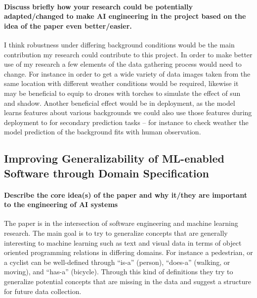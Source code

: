 \documentclass[pra, onecolumn,superscriptaddress,nofootinbib]{revtex4}
\begin{document}
\paragraph{Discuss briefly how your research could be potentially adapted/changed to make AI engineering in the project based on the idea of the paper even better/easier.\\}

    I think robustness under differing background conditions would be the main contribution my research could contribute to this project. In order to make better use of my research a few elements of the data gathering process would need to change. For instance in order to get a wide variety of data images taken from the same location with different weather conditions would be required, likewise it may be beneficial to equip to drones with torches to simulate the effect of sun and shadow. Another beneficial effect would be in deployment, as the model learns features about various backgrounds we could also use those features during deployment to for secondary prediction tasks -- for instance to check weather the model prediction of the background fits with human observation.


\subsection{Improving Generalizability of ML-enabled Software through Domain Specification \cite{software2}}

\paragraph{Describe the core idea(s) of the paper and why it/they are important to the engineering of AI systems\\}

    The paper is in the intersection of software engineering and machine learning research. The main goal is to try to generalize concepts that are generally interesting to machine learning such as text and visual data in terms of object oriented programming relations in differing domains. For instance a pedestrian, or a cyclist can be well-defined through ``is-a'' (person), ``does-a'' (walking, or moving), and ``has-a'' (bicycle). Through this kind of definitions they try to generalize potential concepts that are missing in the data and suggest a structure for future data collection.

          
\end{document}
